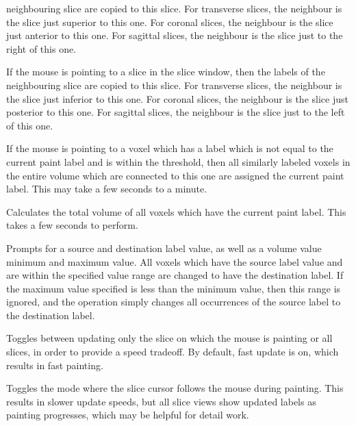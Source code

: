 \documentclass[11pt,letterpaper]{article}
\newcommand{\menutwo}[2]{{\scriptsize \fbox{\bf #1}/\fbox{\bf #2}}}
\begin{document}
\begin{description}
    neighbouring slice are copied to this slice.
    For transverse
    slices, the neighbour is the slice just superior to this one.
    For coronal
    slices, the neighbour is the slice just anterior to this one.
    For sagittal
    slices, the neighbour is the slice just to the right of this one.
\item[\menutwo{Segmenting}{Copy from Lt/Inf/Pos}]  If the mouse is
    pointing to a slice in the slice window, then the labels of the
    neighbouring slice are copied to this slice.
    For transverse
    slices, the neighbour is the slice just inferior to this one.
    For coronal
    slices, the neighbour is the slice just posterior to this one.
    For sagittal
    slices, the neighbour is the slice just to the left of this one.
\item[\menutwo{Segmenting}{Fill 3D}]  If the mouse is pointing to a
    voxel which has a label which is not equal to the current paint
    label and is within the threshold, then
    all similarly labeled voxels in the entire volume which are connected to
    this one are assigned the current paint label.
    This may take a few seconds to a minute.
\item[\menutwo{Segmenting}{Calculate Volume}]  Calculates the
    total volume of all voxels which have the current paint label.
    This takes a few seconds to perform.
\item[\menutwo{Segmenting}{Change Labels}]  Prompts for a source
    and destination label value, as well as a volume value minimum and
    maximum value.  All voxels which have the source label value and
    are within the specified value range are changed to have the
    destination label.  If the maximum value specified is less than
    the minimum value, then this range is ignored, and the operation
    simply changes all occurrences of the source label to the
    destination label.
\item[\menutwo{Segmenting}{Fast Update}]  Toggles between updating only
    the slice on which the mouse is painting or all slices, in order to
    provide a speed
    tradeoff.  By default, fast update is on, which results in fast painting.
\item[\menutwo{Segmenting}{Cursor Follows}]  Toggles the mode where the
    slice cursor follows the mouse during painting.  This results in slower
    update speeds, but all slice views show updated labels as painting
    progresses, which may be helpful for detail work.
\end{description}
\end{document}
